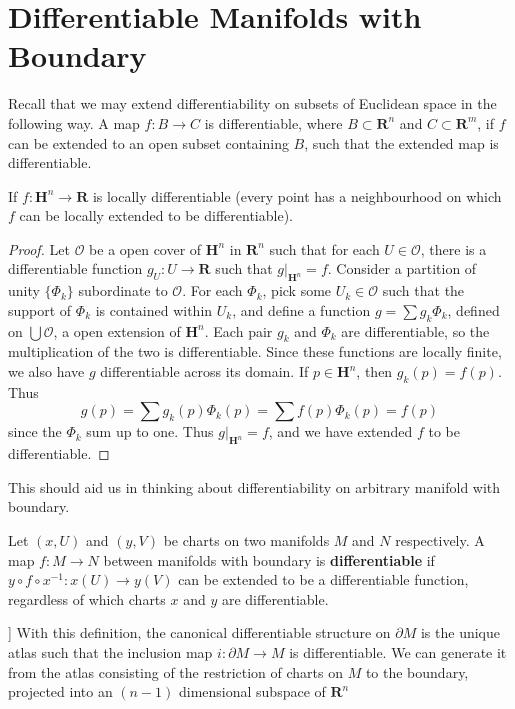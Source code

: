 \section{Differentiable Manifolds with Boundary}

Recall that we may extend differentiability on subsets of Euclidean space in the following way. A map $f:B \to C$ is differentiable, where $B \subset \mathbf{R}^n$ and $C \subset \mathbf{R}^m$, if $f$ can be extended to an open subset containing $B$, such that the extended map is differentiable.

\begin{theorem}
    If $f:\mathbf{H}^n \to \mathbf{R}$ is locally differentiable (every point has a neighbourhood on which $f$ can be locally extended to be differentiable).
\end{theorem}
\begin{proof}
    Let $\mathcal{O}$ be a open cover of $\mathbf{H}^n$ in $\mathbf{R}^n$ such that for each $U \in \mathcal{O}$, there is a differentiable function $g_U:U \to \mathbf{R}$ such that $g|_{\mathbf{H}^n} = f$. Consider a partition of unity $\{ \Phi_k \}$ subordinate to $\mathcal{O}$. For each $\Phi_k$, pick some $U_k \in \mathcal{O}$ such that the support of $\Phi_k$ is contained within $U_k$, and define a function $g = \sum g_k \Phi_k$, defined on $\bigcup \mathcal{O}$, a open extension of $\mathbf{H}^n$. Each pair $g_k$ and $\Phi_k$ are differentiable, so the multiplication of the two is differentiable. Since these functions are locally finite, we also have $g$ differentiable across its domain. If $p \in \mathbf{H}^n$, then $g_k(p) = f(p)$. Thus
    \[ g(p) = \sum g_k(p) \Phi_k(p) = \sum f(p) \Phi_k(p) = f(p) \]
    since the $\Phi_k$ sum up to one. Thus $g|_{\mathbf{H}^n} = f$, and we have extended $f$ to be differentiable.
\end{proof}

This should aid us in thinking about differentiability on arbitrary manifold with boundary.

\begin{definition}
    Let $(x,U)$ and $(y,V)$ be charts on two manifolds $M$ and $N$ respectively. A map $f:M \to N$ between manifolds with boundary is {\bf differentiable} if $y \circ f \circ x^{-1}:x(U) \to y(V)$ can be extended to be a differentiable function, regardless of which charts $x$ and $y$ are differentiable.
\end{definition}

\begin{example}]
    With this definition, the canonical differentiable structure on $\partial M$ is the unique atlas such that the inclusion map $i:\partial M \to M$ is differentiable. We can generate it from the atlas consisting of the restriction of charts on $M$ to the boundary, projected into an $(n-1)$ dimensional subspace of $\mathbf{R}^n$
\end{example}















